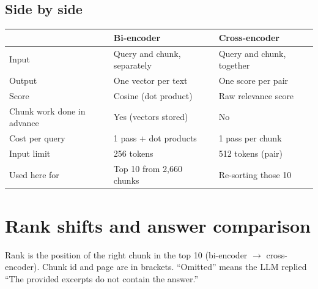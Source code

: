 \documentclass[10pt,a4paper]{article}
\begin{document}
\subsection*{Side by side}
\begin{center}\small
\begin{tabular}{@{}l l l@{}}
\toprule
 & Bi-encoder & Cross-encoder \\
\midrule
Input & Query and chunk, separately & Query and chunk, together \\
Output & One vector per text & One score per pair \\
Score & Cosine (dot product) & Raw relevance score \\
Chunk work done in advance & Yes (vectors stored) & No \\
Cost per query & 1 pass + dot products & 1 pass per chunk \\
Input limit & 256 tokens & 512 tokens (pair) \\
Used here for & Top 10 from 2,660 chunks & Re-sorting those 10 \\
\bottomrule
\end{tabular}
\end{center}

\section{Rank shifts and answer comparison}

Rank is the position of the right chunk in the top 10 (bi-encoder $\rightarrow$ cross-encoder). Chunk id and page are in brackets. ``Omitted'' means the LLM replied ``The provided excerpts do not contain the answer.''
\end{document}
